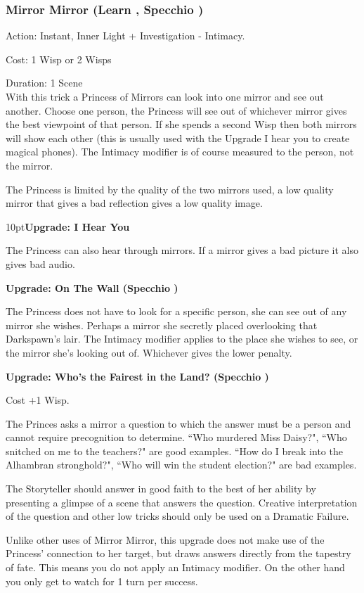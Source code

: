 \subsubsection*{Mirror Mirror (Learn \textbullet\textbullet, Specchio \textbullet\textbullet)}

\noindent Action: Instant, Inner Light + Investigation - Intimacy.

\noindent Cost: 1 Wisp or 2 Wisps

\noindent Duration: 1 Scene\\

\noindent With this trick a Princess of Mirrors can look into one mirror and see out another. Choose one person, the Princess will see out of whichever mirror gives the best viewpoint of that person. If she spends a second Wisp then both mirrors will show each other (this is usually used with the Upgrade I hear you to create magical phones). The Intimacy modifier is of course measured to the person, not the mirror. 

The Princess is limited by the quality of the two mirrors used, a low quality mirror that gives a bad reflection gives a low quality image.

\begin{myindentpar}{10pt}\textbf{Upgrade: I Hear You}

The Princess can also hear through mirrors. If a mirror gives a bad picture it also gives bad audio.

\textbf{Upgrade: On The Wall (Specchio \textbullet\textbullet\textbullet)}

The Princess does not have to look for a specific person, she can see out of any mirror she wishes. Perhaps a mirror she secretly placed overlooking that Darkspawn's lair. The Intimacy modifier applies to the place she wishes to see, or the mirror she's looking out of. Whichever gives the lower penalty.

\textbf{Upgrade: Who's the Fairest in the Land? (Specchio \textbullet\textbullet\textbullet\textbullet\textbullet)}

Cost +1 Wisp.

The Princes asks a mirror a question to which the answer must be a person and cannot require precognition to determine. \textquotedblleft Who murdered Miss Daisy?", \textquotedblleft Who snitched on me to the teachers?" are good examples. \textquotedblleft How do I break into the Alhambran stronghold?", \textquotedblleft Who will win the student election?" are bad examples.

The Storyteller should answer in good faith to the best of her ability by presenting a glimpse of a scene that answers the question. Creative interpretation of the question and other low tricks should only be used on a Dramatic Failure.

Unlike other uses of Mirror Mirror, this upgrade does not make use of the Princess' connection to her target, but draws answers directly from the tapestry of fate. This means you do not apply an Intimacy modifier. On the other hand you only get to watch for 1 turn per success. 

\end{myindentpar}

